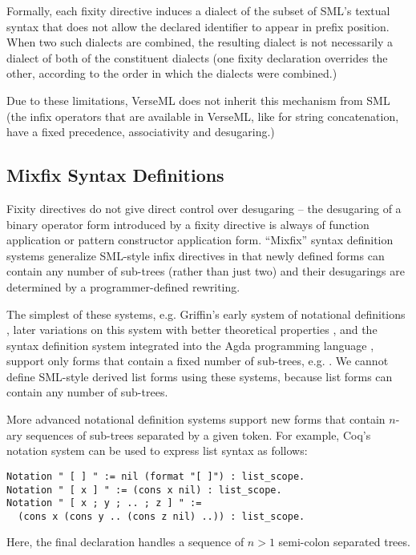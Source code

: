 
Formally, each fixity directive induces a dialect of the subset of SML's textual syntax that does not allow the declared identifier to appear in prefix position. When two such dialects are combined, the resulting dialect is not necessarily a dialect of both of the constituent dialects (one fixity declaration overrides the other, according to the order in which the dialects were combined.)

Due to these limitations, VerseML does not inherit this mechanism from SML (the infix operators that are available in VerseML, like \li{^} for string concatenation, have a fixed precedence, associativity and desugaring.)

\subsection{Mixfix Syntax Definitions}\label{sec:mixfix}
Fixity directives do not give direct control over desugaring -- the  desugaring of a binary operator form introduced by a fixity directive is always of function application or pattern constructor application form. ``Mixfix'' syntax definition systems generalize SML-style infix directives in that newly defined forms can contain any number of sub-trees (rather than just two) and their desugarings are determined by a programmer-defined rewriting. 

The simplest of these systems, e.g. Griffin's early system of notational definitions \cite{5134}, later variations on this system with better theoretical properties \cite{DBLP:conf/gpce/TahaJ03}, and the syntax definition system integrated into the Agda programming language \cite{DBLP:conf/ifl/DanielssonN08}, support only forms that contain a fixed number of sub-trees, e.g. . We cannot define SML-style derived list forms using these systems, because list forms can contain any number of sub-trees.

More advanced notational definition systems support new forms that contain $n$-ary sequences of sub-trees separated by a given token. For example, Coq's notation system \cite{Coq:manual} can be used to express list syntax as follows:
\begin{lstlisting}[numbers=none]
Notation " [ ] " := nil (format "[ ]") : list_scope.
Notation " [ x ] " := (cons x nil) : list_scope.
Notation " [ x ; y ; .. ; z ] " := 
  (cons x (cons y .. (cons z nil) ..)) : list_scope.
\end{lstlisting}
Here, the final declaration handles a sequence of $n > 1$ semi-colon separated trees.

